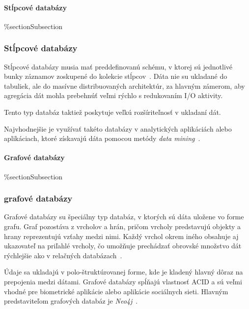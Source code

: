 %
%
{
	\paragraph{Stĺpcové databázy}
}
{
	\%section{Subsection}
	\subsubsection{Stĺpcové databázy}
}
\label{subsubsection:column_db}
Stĺpcové databázy musia mať preddefinovanú schému, v ktorej sú jednotlivé bunky záznamov zoskupené do kolekcie stĺpcov~\cite{MongoDBvsMySQL2015}. Dáta nie su ukladané do tabuliek, ale do masívne distribuovaných architektúr, za hlavným zámerom, aby agregácia dát mohla prebehnúť veľmi rýchlo s redukovaním I/O aktivity.

Tento typ databáz taktiež poskytuje veľkú rozšíriteľnosť v ukladaní dát.

Najvhodnejšie je využívať takéto databázy v analytických aplikáciách alebo aplikáciach, ktoré získavajú dáta pomocou metódy \textit{data mining}~\cite{NoSQLDBvsRealtionDB}.

%
%
{
	\paragraph{Grafové databázy}
}
{
	\%section{Subsection}
	\subsubsection{grafové databázy}
}
\label{subsubsection:graph_db}
Grafové databázy su špeciálny typ databáz, v ktorých sú dáta uložene vo forme grafu. Graf pozostáva z vrcholov a hrán, pričom vrcholy predstavujú objekty a hrany reprezentujú vzťahy medzi nimi. Každý vrchol okrem iného obsahuje aj ukazovateľ na priľahlé vrcholy, čo umožňuje prechádzať obrovské množstvo dát rýchlejšie ako v relačných databázach~\cite{NoSQLDBvsRealtionDB}.

Údaje sa ukladajú v polo-štruktúrovanej forme, kde je kladený hlavný dôraz na prepojenia medzi dátami. Grafové databázy spĺňajú vlastnosť ACID a sú veľmi vhodné pre biometrické aplikácie alebo aplikácie sociálnych sieti. Hlavným predstaviteľom grafových databáz je \textit{Neo4j}~\cite{NoSQLDBvsRealtionDB}.

